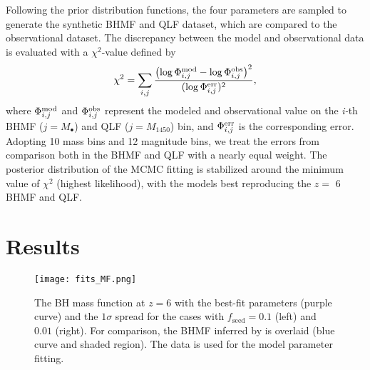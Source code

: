 \documentclass[twocolumn, twocolappendix]{aastex63}
\newcommand{\Mbh}{M_\bullet}
\newcommand{\fseed}{f_\mathrm{seed}}
\newcommand{\Muv}{M_{1450}}
\begin{document}
\begin{CJK*}{UTF8}{gbsn}
Following the prior distribution functions, the four parameters are sampled to generate the synthetic 
BHMF and QLF dataset, which are compared to the observational dataset. 
The discrepancy between the model and observational data is evaluated with a $\chi^2$-value defined by
\begin{align}
  \chi^2 = \sum_{i,j}
  \frac{\left(\log{\Phi^{\rm mod}_{i,j}} - \log{\Phi^{\rm obs}_{i,j}}\right)^2}{(\log{\Phi^{\rm err}_{i,j}})^2},
\end{align}
where $\Phi^{\rm mod}_{i,j}$ and $\Phi^{\rm obs}_{i,j}$ represent the modeled and observational value 
on the \textit{i-}th BHMF ($j=\Mbh$) and QLF ($j=\Muv$) bin, and $\Phi^{\rm err}_{i,j}$ is the corresponding error.
Adopting 10 mass bins and 12 magnitude bins, we treat the errors from comparison both in the BHMF and QLF
with a nearly equal weight.
The posterior distribution of the MCMC fitting is stabilized around the minimum value of $\chi^2$ (highest likelihood), 
with the models best reproducing the $z=$ 6 BHMF and QLF.



\vspace{2mm}
\section{Results}\label{sec:result}


\begin{figure*}
\centering
\texttt{[image: fits\_MF.png]}
\caption{
The BH mass function at $z=6$ with the best-fit parameters (purple curve) and the $1\sigma$ spread for the cases with $\fseed=0.1$ (left) and $0.01$ (right). 
For comparison, the BHMF inferred by  is overlaid (blue curve and shaded region).
The data is used for the model parameter fitting.
}
\label{fig:fitmf}
\end{figure*}



\end{CJK*}
\end{document}
